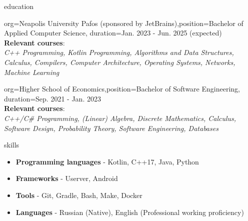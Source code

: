 \documentclass{resume}
\begin{document}
\makeheader

\begin{ResumeSection}{education}
    \begin{ResumeSubsection}{org={Neapolis University Pafos (sponsored by JetBrains)},position={Bachelor of Applied Computer Science}, duration={Jan. 2023 - Jun. 2025 (expected)}} \\
    \textbf{Relevant courses}: \\
	\textit{C++ Programming, Kotlin Programming, Algorithms and Data Structures, Calculus, Compilers, Computer Architecture, Operating Systems, Networks, Machine Learning}  
    \end{ResumeSubsection}
	\begin{ResumeSubsection}{org={Higher School of Economics},position={Bachelor of Software Engineering}, duration={Sep. 2021 - Jan. 2023}} \\
    \textbf{Relevant courses}: \\
		\textit{C++/C\# Programming, (Linear) Algebra, Discrete Mathematics, Calculus, Software Design, Probability Theory, Software Engineering, Databases}
    \end{ResumeSubsection}
\end{ResumeSection}

\begin{ResumeSection}{skills}
    \newcommand{\skill}[2]{\textbf{#1} - #2}
        \begin{itemize}
            \item \skill{Programming languages}{Kotlin, C++17, Java, Python}
			\item \skill{Frameworks}{Userver, Android}
            \item \skill{Tools}{Git, Gradle, Bash, Make, Docker}
            \item \skill{Languages}{Russian (Native), English (Professional working proficiency)}
        \end{itemize}
\end{ResumeSection}
\end{document}
